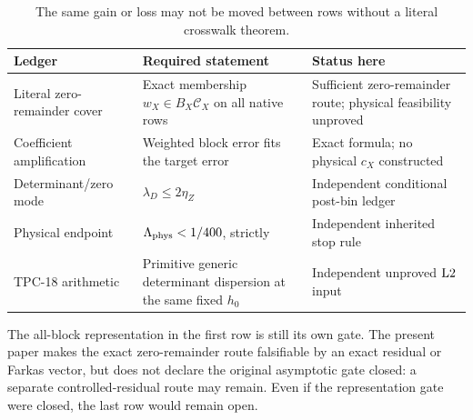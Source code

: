 \begin{table}[ht]
\centering
\small
\begin{tabularx}{\textwidth}{@{}
  >{\raggedright\arraybackslash}p{}
  >{\raggedright\arraybackslash}X
  >{\raggedright\arraybackslash}p{}@{}}
\toprule
Ledger & Required statement & Status here\\
\midrule
Literal zero-remainder cover
&
Exact membership \(w_X\in B_X\mathscr C_X\) on all native rows
&
Sufficient zero-remainder route; physical feasibility unproved
\\
\addlinespace
Coefficient amplification
&
Weighted block error fits the target error
&
Exact formula; no physical \(c_X\) constructed
\\
\addlinespace
Determinant/zero mode
&
\(\lambda_D\le2\eta_Z\)
&
Independent conditional post-bin ledger
\\
\addlinespace
Physical endpoint
&
\(\Lambda_{\mathrm{phys}}<1/400\), strictly
&
Independent inherited stop rule
\\
\addlinespace
TPC-18 arithmetic
&
Primitive generic determinant dispersion at the same fixed \(h_0\)
&
Independent unproved \(\mathrm{L2}\) input
\\
\bottomrule
\end{tabularx}
\caption{The same gain or loss may not be moved between rows without
a literal crosswalk theorem.}
\label{tab:independent-ledgers}
\end{table}

\begin{remark}
The all-block representation in the first row is still its own gate.
The present paper makes the exact zero-remainder route falsifiable by
an exact residual or Farkas vector, but does not declare the original
asymptotic gate closed: a separate controlled-residual route may
remain.  Even if the representation gate were closed, the last row
would remain open.
\end{remark}
